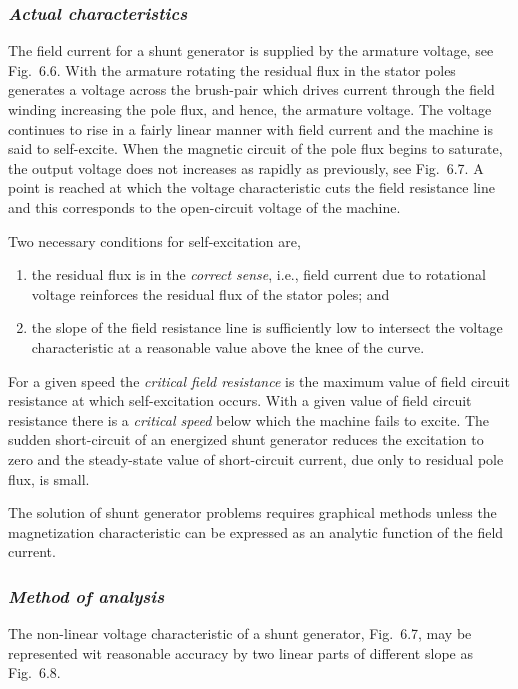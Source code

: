 \documentclass[a4paper,numbers=noenddot,12pt]{scrbook}
\begin{document}
\subsubsection{\textit{Actual characteristics}}
The field current for a shunt generator is supplied by the armature voltage, see Fig.\ 6.6. With the armature rotating the residual flux in the stator poles generates a voltage across the brush-pair which drives current through the field winding increasing the pole flux, and hence, the armature voltage. The voltage continues to rise in a fairly linear manner with field current and the machine is said to self-excite. When the magnetic circuit of the pole flux
begins to saturate, the output voltage does not increases as rapidly as previously, see Fig.\ 6.7. A point is reached at which the voltage characteristic cuts the field resistance line and this corresponds to the open-circuit voltage of the machine.

Two necessary conditions for self-excitation are,
\begin{enumerate}
    \item the residual flux is in the \textit{correct sense}, i.e., field current due to rotational voltage reinforces the residual flux of the stator poles; and
    \item the slope of the field resistance line is sufficiently low to intersect the voltage characteristic at a reasonable value above the knee of the curve.
\end{enumerate}
For a given speed the \textit{critical field resistance} is the maximum value of field circuit resistance at which self-excitation occurs. With a given value of field circuit resistance there is a  \textit{critical speed} below which the machine fails to excite. The sudden short-circuit of an energized shunt generator reduces the excitation to zero and the steady-state value of short-circuit current, due only to residual pole flux, is small.

The solution of shunt generator problems requires graphical methods unless the magnetization characteristic can be expressed as an analytic function of the field current.

\subsubsection{\textit{Method of analysis}}
The non-linear voltage characteristic of a shunt generator, Fig.\ 6.7, may be represented wit reasonable accuracy by two linear parts of different slope as Fig.\ 6.8.
\end{document}
